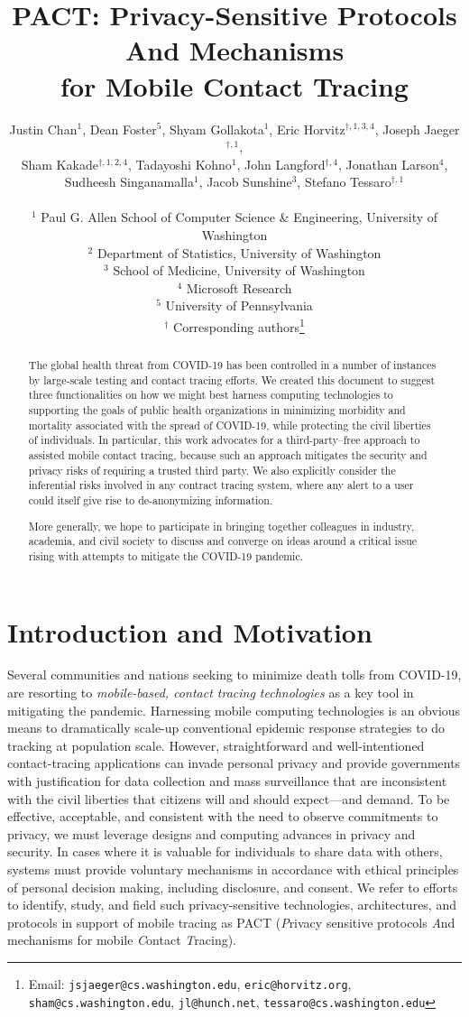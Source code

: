 \documentclass{article}
\title{{\Huge PACT\/}:   {\Huge P\/}rivacy-Sensitive Protocols {\Huge A\/}nd Mechanisms
\\for Mobile {\Huge C\/}ontact {\Huge T\/}racing }
\date{}
\author{
Justin Chan$^{1}$, Dean Foster$^{5}$, Shyam Gollakota$^{1}$, Eric Horvitz$^{\dag,1,3,4}$,  Joseph Jaeger$^{\dag,1}$,\\ 
Sham Kakade$^{\dag,1,2,4}$, Tadayoshi Kohno$^{1}$, John Langford$^{\dag,4}$, Jonathan Larson$^{4}$,\\   Sudheesh Singanamalla$^{1}$,
Jacob Sunshine$^{3}$, Stefano Tessaro$^{\dag,1}$  
\\
\\
	$^1$ Paul G. Allen School of Computer Science \& Engineering, University of Washington
\\
	$^2$ Department of Statistics, University of Washington
\\
	$^3$ School of Medicine, University of Washington
\\
	$^4$ Microsoft Research
\\
	$^5$ University of Pennsylvania
\\
	$^{\dag}$ Corresponding authors\footnote{Email: \texttt{jsjaeger@cs.washington.edu}, \texttt{eric@horvitz.org}, \texttt{sham@cs.washington.edu}, \texttt{jl@hunch.net},
	\texttt{tessaro@cs.washington.edu}
	}
}
\begin{document}
\maketitle


\begin{abstract}
The global health threat from COVID-19 has been controlled in a number of instances by large-scale testing and contact tracing efforts.
We created this document to suggest three functionalities on how we might best harness computing technologies to supporting the goals of public health organizations in minimizing morbidity and mortality associated with the spread of COVID-19, 
while protecting the civil liberties of individuals.
In particular, this work advocates for a third-party--free approach to assisted mobile contact tracing, because such an approach mitigates the security and privacy risks of requiring a trusted third party. We also explicitly consider the inferential risks involved in any contract tracing system, where any alert to a user could itself give rise to de-anonymizing information.  

More generally, we hope to participate in bringing together colleagues in industry, academia, and civil society to discuss and converge on ideas around a critical issue rising with attempts to mitigate the COVID-19 pandemic.
\end{abstract}


\section{Introduction and Motivation}

Several communities and nations seeking to minimize death tolls from COVID-19, are resorting to \emph{mobile-based, contact tracing technologies} as a key tool in mitigating the pandemic. Harnessing mobile computing technologies is an obvious means to dramatically scale-up conventional epidemic response strategies to do tracking at population scale. However, straightforward and well-intentioned contact-tracing applications can invade personal privacy and provide governments with justification for data collection and mass surveillance that are inconsistent with the civil liberties that citizens will and should expect---and demand. To be effective, acceptable, and consistent with the need to observe commitments to privacy, we must leverage designs and computing advances in privacy and security. In cases where it is valuable for individuals to share data with others, systems must provide voluntary mechanisms in accordance with ethical principles of personal decision making, including disclosure, and consent. We refer to efforts to identify, study, and field such privacy-sensitive technologies, architectures, and protocols in support of mobile tracing as PACT (\emph{P}rivacy sensitive protocols \emph{A}nd mechanisms for mobile \emph{C}ontact \emph{T}racing).
\end{document}
